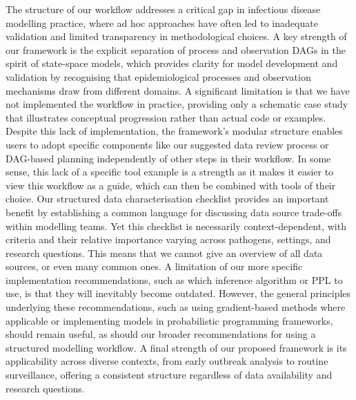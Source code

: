 \documentclass{article}
\begin{document}
The structure of our workflow addresses a critical gap in infectious disease modelling practice, where ad hoc approaches have often led to inadequate validation and limited transparency in methodological choices.
A key strength of our framework is the explicit separation of process and observation \ac{DAG}s in the spirit of state-space models, which provides clarity for model development and validation by recognising that epidemiological processes and observation mechanisms draw from different domains.
A significant limitation is that we have not implemented the workflow in practice, providing only a schematic case study that illustrates conceptual progression rather than actual code or examples.
Despite this lack of implementation, the framework's modular structure enables users to adopt specific components like our suggested data review process or DAG-based planning independently of other steps in their workflow.
In some sense, this lack of a specific tool example is a strength as it makes it easier to view this workflow as a guide, which can then be combined with tools of their choice.
Our structured data characterisation checklist provides an important benefit by establishing a common language for discussing data source trade-offs within modelling teams.
Yet this checklist is necessarily context-dependent, with criteria and their relative importance varying across pathogens, settings, and research questions.
This means that we cannot give an overview of all data sources, or even many common ones.
A limitation of our more specific implementation recommendations, such as which inference algorithm or \ac{PPL} to use, is that they will inevitably become outdated. However, the general principles underlying these recommendations, such as using gradient-based methods where applicable or implementing models in probabilistic programming frameworks, should remain useful, as should our broader recommendations for using a structured modelling workflow.
A final strength of our proposed framework is its applicability across diverse contexts, from early outbreak analysis to routine surveillance, offering a consistent structure regardless of data availability and research questions.


\end{document}
